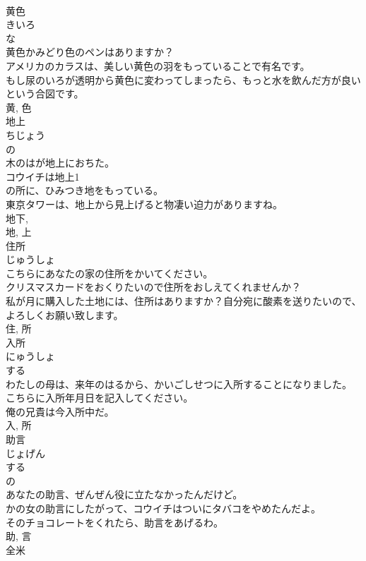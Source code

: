 \documentclass[8pt]{extreport}
\begin{document}
\begin{CJK}{UTF8}{min}
\\	黄色	
\\	きいろ	
\\	な 
\\	黄色かみどり色のペンはありますか？	
\\	アメリカのカラスは、美しい黄色の羽をもっていることで有名です。	
\\	もし尿のいろが透明から黄色に変わってしまったら、もっと水を飲んだ方が良いという合図です。	
\\	黄, 色	
\\	地上	
\\	ちじょう	
\\	の 
\\	木のはが地上におちた。	
\\	コウイチは地上1
\\	の所に、ひみつき地をもっている。	
\\	東京タワーは、地上から見上げると物凄い迫力がありますね。	
\\	地下, 
\\	地, 上	
\\	住所	
\\	じゅうしょ	
\\	こちらにあなたの家の住所をかいてください。	
\\	クリスマスカードをおくりたいので住所をおしえてくれませんか？	
\\	私が月に購入した土地には、住所はありますか？自分宛に酸素を送りたいので、よろしくお願い致します。	
\\	住, 所	
\\	入所	
\\	にゅうしょ	
\\	する 
\\	わたしの母は、来年のはるから、かいごしせつに入所することになりました。	
\\	こちらに入所年月日を記入してください。	
\\	俺の兄貴は今入所中だ。	
\\	入, 所	
\\	助言	
\\	じょげん	
\\	する 
\\	の 
\\	あなたの助言、ぜんぜん役に立たなかったんだけど。	
\\	かの女の助言にしたがって、コウイチはついにタバコをやめたんだよ。	
\\	そのチョコレートをくれたら、助言をあげるわ。	
\\	助, 言	
\\	全米	

\end{CJK}
\end{document}
